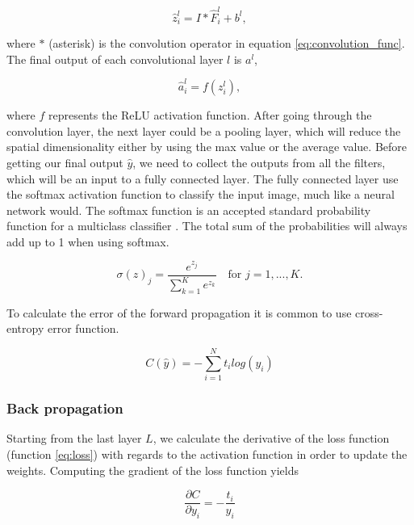 \documentclass[thesis.tex]{subfiles}
\begin{document}
\begin{equation}
    \hat{z}_i^l = I * \hat{F}_i^l + b^l, 
\end{equation}

where $*$ (asterisk) is the convolution operator in equation \ref{eq:convolution_func}. The final output of each convolutional layer $l$ is $a^l$,

\begin{equation}
    \hat{a}_i^l = f(z_i^l), 
\end{equation}

where $f$ represents the ReLU activation function. After going through the convolution layer, the next layer could be a pooling layer, which will reduce the spatial dimensionality either by using the max value or the average value.
Before getting our final output $\hat{y}$, we need to collect the outputs from all the filters, which will be an input to a fully connected layer. 
The fully connected layer use the softmax activation function to classify the input image, much like a neural network would. The softmax function is an accepted standard probability function for a multiclass classifier \cite{NotesBackpropagation16}. The total sum of the probabilities will always add up to 1 when using softmax. 

\begin{equation} %
  \sigma(z)_j = \frac{e^{z_j}}{\sum_{k=1}^{K} e^{z_k}} \quad \text{for } j = 1, ..., K.
  \label{eq:softmax}
\end{equation}

To calculate the error of the forward propagation it is common to use cross-entropy error function.

\begin{equation} %
  C(\hat{y}) = - \sum_{i=1}^N t_i log(y_i)
  \label{eq:loss}
\end{equation}


\subsubsection{Back propagation}
Starting from the last layer $L$, we calculate the derivative of the loss function (function \ref{eq:loss}) with regards to the activation function in order to update the weights. Computing the gradient of the loss function yields

\begin{equation}
  \frac{\partial C}{\partial y_i} = - \frac{t_i}{y_i}
\end{equation}
\end{document}
